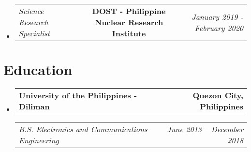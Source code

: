 \documentclass[11pt,letterpaper]{article}
\makeatletter
\newcommand{\headerrow}[2]
{\begin{tabular*}{\linewidth}{l@{\extracolsep{\fill}}r}
#1 &
#2 \\
\end{tabular*}}
\newcommand{\headerrowthree}[3]{%
  \begin{tabular*}{\linewidth}{l@{\extracolsep{\fill}}c@{\extracolsep{\fill}}r}
    #1 & %
    #2 & %
    #3 \\ %
  \end{tabular*}
}
\makeatother
\begin{document}
\begin{itemize}[leftmargin=1em]
	\item
	      \headerrowthree
	      {\emph{Science Research Specialist}}
	      {\textbf{DOST - Philippine Nuclear Research Institute}}
	      {\textit{January 2019 - February 2020}}
\end{itemize}

\section*{\Large Education}

\begin{itemize}[leftmargin=1em]
	\parskip=0.1em
		
	\item
	      \headerrow
	      {\textbf{University of the Philippines - Diliman}}
	      {\textbf{Quezon City, Philippines}}
	      \headerrow
	      {\emph{B.S. Electronics and Communications Engineering}}
	      {\emph{June 2013 -- December 2018}}
	      	      
\end{itemize}
\end{document}
